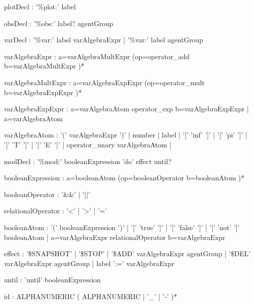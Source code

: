 \begin{bnfsource}




plotDecl :
  '\%plot:' label

obsDecl :
  '\%obs:' label? agentGroup

varDecl :
  '\%var:' label varAlgebraExpr
   | '\%var:' label agentGroup

varAlgebraExpr :
  a=varAlgebraMultExpr (op=operator_add b=varAlgebraMultExpr )*
  
varAlgebraMultExpr :
  a=varAlgebraExpExpr (op=operator_mult b=varAlgebraExpExpr )*
  
varAlgebraExpExpr :
  a=varAlgebraAtom operator_exp b=varAlgebraExpExpr
  | a=varAlgebraAtom
  
varAlgebraAtom :
  '(' varAlgebraExpr ')'
  | number
  | label
  | '[' 'inf' ']'
  | '[' 'pi' ']'
  | '[' 'T' ']'
  | '[' 'E' ']'
  | operator_unary varAlgebraAtom
  | 
  
modDecl :
  '\%mod:' booleanExpression 'do' effect until?
  
booleanExpression :
  a=booleanAtom (op=booleanOperator b=booleanAtom )*
  
booleanOperator :
  '&&' | '||'

relationalOperator :
  '<' | '>' | '='

booleanAtom :
  '(' booleanExpression ')'
  | '[' 'true' ']'
  | '[' 'false' ']'
  | '[' 'not' ']' booleanAtom
  | a=varAlgebraExpr relationalOperator b=varAlgebraExpr

effect :
  '\$SNAPSHOT'
  | '\$STOP'
  | '\$ADD' varAlgebraExpr agentGroup
  | '\$DEL' varAlgebraExpr agentGroup
  | label ':=' varAlgebraExpr
  
until :
  'until' booleanExpression
  
  
  
id :
  ALPHANUMERIC ( ALPHANUMERIC | '_' | '-' )* 


\end{bnfsource}
